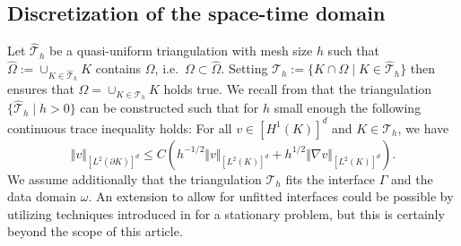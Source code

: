 \documentclass[sn-mathphys-num]{sn-jnl}
\numberwithin{equation}{section}
\begin{document}
\subsection{Discretization of the space-time domain}\label{sec:spaceTimeDiscretization}
Let $\hat{\mathcal{T}}_h$ be a quasi-uniform triangulation with mesh size $h$ such that $\hat{\Omega}:= \cup_{K \in \hat{\mathcal{T}}_h} K $ contains $\Omega$, i.e.\ $\Omega \subset \hat{\Omega}$. Setting $\mathcal{T}_h := \{ K \cap \Omega \mid K \in  \hat{\mathcal{T}}_h \}$ then ensures that $\Omega = \cup_{K \in \mathcal{T}_h} K$ holds true.  
We recall from  \cite[Sec. 4.2]{BFMO21control} that the triangulation $\{ \hat{\mathcal{T}}_h \mid h > 0 \}$ can be constructed such that for $h$ small enough the following continuous trace inequality holds:  For all $v \in [H^1(K)]^d$ and $K \in \mathcal{T}_h$, we have
\begin{equation}\label{eq:traceInequality}
    \Vert v \Vert_{[L^2(\partial K)]^d} \le C \left(h^{-1/2} \Vert v \Vert_{[L^2(K)]^d} + h^{1/2} \Vert \nabla v \Vert_{[L^2(K)]^d} \right).  
\end{equation}
We assume additionally that the triangulation $\mathcal{T}_h$ fits the interface $\Gamma$ and the data domain $\omega$. An extension to allow for unfitted interfaces could be possible by utilizing techniques introduced in \cite{BP25} for a stationary problem, but this is certainly beyond the scope of this article. 
\end{document}
